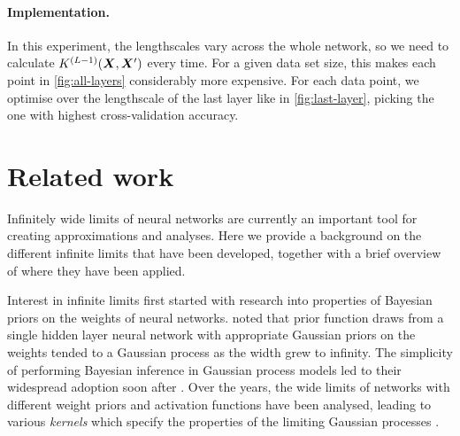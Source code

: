 \documentclass[accepted]{uai2021} %
\newcommand{\covf}[1]{K\ssup{#1}}
\newcommand{\0}{\boldsymbol{0}}
\newcommand{\1}{\boldsymbol{1}}
\begin{document}
\paragraph{Implementation.}
In this experiment, the lengthscales vary across the whole network, so we need to calculate $\covf{L-1}\bra{\mX,\mX'}$ every time. For a given data set size, this makes each point in \cref{fig:all-layers} considerably more expensive. For each data point, we optimise over the lengthscale of the last layer like in \cref{fig:last-layer}, picking the one with highest cross-validation accuracy.


\section{Related work}
Infinitely wide limits of neural networks are currently an important tool for creating approximations and analyses. Here we provide a background on the different infinite limits that have been developed, together with a brief overview of where they have been applied.

Interest in infinite limits first started with research into properties of Bayesian priors on the weights of neural networks. \citet{neal1996bayesian} noted that prior function draws from a single hidden layer neural network with appropriate Gaussian priors on the weights tended to a Gaussian process as the width grew to infinity. The simplicity of performing Bayesian inference in Gaussian process models led to their widespread adoption soon after \citep{williams1996gpr,gpml}. Over the years, the wide limits of networks with different weight priors and activation functions have been analysed, leading to various \emph{kernels} which specify the properties of the limiting Gaussian processes \citep{williams1997inf,cho2009mkm}.
\end{document}
